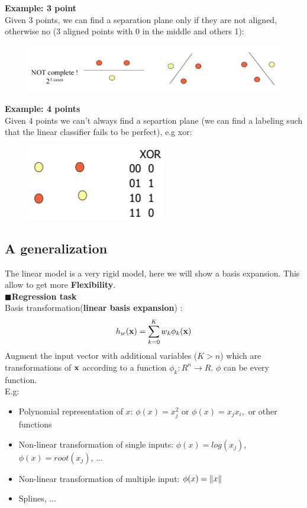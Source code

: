 \documentclass[../main.tex]{subfiles}
\begin{document}
\textbf{Example: 3 point}\\
Given 3 points, we can find a separation plane only if they are not aligned, otherwise no (3 aligned points with 0 in the middle and others 1):

\begin{figure}[H]
    \centering
    \includegraphics[scale = 0.4]{lectures/2_linear_model/2_eg_three_point.png}
\end{figure}

\textbf{Example: 4 points}\\
Given 4 points we can't always find a separtion plane (we can find a labeling such that the linear classifier fails to be perfect), e.g xor:
\begin{figure}[H]
    \centering
    \includegraphics[scale = 0.4]{lectures/2_linear_model/2_eg_xor.png}
\end{figure}


\subsection{A generalization}
The linear model is a very rigid model, here we will show a basis expansion. This allow to get more \textbf{Flexibility}.\\

\noindent$\blacksquare$\textbf{Regression task}\\
Basis transformation(\textbf{linear basis expansion}) :
$$h_w(\bold{x})=\sum_{k = 0}^{K} w_k\phi_k(\bold{x})$$
Augment the input vector with additional variables ($K>n$) which are transformations of $\bold{x}$ according to a function $\phi_k: R^n\rightarrow R$. $\phi$ can be every function.\\

E.g:
\begin{itemize}
    \item Polynomial representation of $x$: $\phi(x) = x_j^2$ or $\phi(x) = x_jx_i,$ or other functions
    \item Non-linear transformation of single inputs: $\phi(x) = log(x_j)$, $\phi(x) = root(x_j)$, ...
    \item Non-linear transformation of multiple input: $\phi(x) = \left\lVert x\right\rVert$
    \item Splines, ...
\end{itemize}
\end{document}
